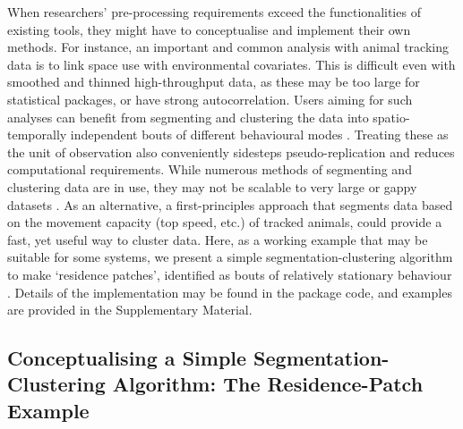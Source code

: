    When researchers' pre-processing requirements exceed the functionalities of existing tools, they might have to conceptualise and implement their own methods.
    For instance, an important and common analysis with animal tracking data is to link space use with environmental covariates.
    This is difficult even with smoothed and thinned high-throughput data, as these may be too large for statistical packages, or have strong autocorrelation.
    Users aiming for such analyses can benefit from segmenting and clustering the data into spatio-temporally independent bouts of different behavioural modes \citep{patin2020a}.
    Treating these as the unit of observation also conveniently sidesteps pseudo-replication and reduces computational requirements.
    While numerous methods of segmenting and clustering data are in use, they may not be scalable to very large or gappy datasets \citep{patin2020a, langrock2012, michelot2016}.
    As an alternative, a first-principles approach that segments data based on the movement capacity (top speed, etc.) of tracked animals, could provide a fast, yet useful way to cluster data.
    Here, as a working example that may be suitable for some systems, we present a simple segmentation-clustering algorithm to make `residence patches', identified as bouts of relatively stationary behaviour \citep[][]{barraquand2008,bijleveld2016,oudman2018}.
    Details of the implementation may be found in the package code, and examples are provided in the Supplementary Material.

    \subsection*{Conceptualising a Simple Segmentation-Clustering Algorithm: The Residence-Patch Example}

